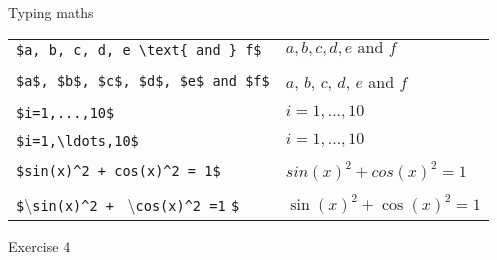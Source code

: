 \begin{frame}[fragile]{Typing maths}
\begin{table}
\centering
\begin{tabular}{ll}
\color{red}\lstinline|$a, b, c, d, e \text{ and } f$| \hspace{1cm} &
\color{red}$a, b, c, d, e \text{ and } f$ \\
      & \\
\color{mLightGreen}\lstinline|$a$, $b$, $c$, $d$, $e$ and $f$| &
\color{mLightGreen}$a$, $b$, $c$, $d$, $e$ and $f$\hspace{1cm}\\
      & \\
\color{red}\lstinline|$i=1,...,10$| &
\color{red}$i=1,...,10$ \\ 
      & \\
\color{mLightGreen}\lstinline|$i=1,\ldots,10$| &
\color{mLightGreen}$i=1,\ldots,10$ \\ 
      & \\
\color{red}\lstinline|$sin(x)^2 + cos(x)^2 = 1$| &
\color{red}$sin(x)^2 + cos(x)^2 = 1$ \\
      & \\
\color{mLightGreen}\lstinline|$|\textbackslash\lstinline|sin(x)^2 + |
                                \textbackslash\lstinline|cos(x)^2 =1|
\lstinline|$| &
\color{mLightGreen}$\sin(x)^2 + \cos(x)^2 = 1$ \\
\end{tabular}
\end{table}
\end{frame}

\begin{frame}[standout]
Exercise 4
\end{frame}
